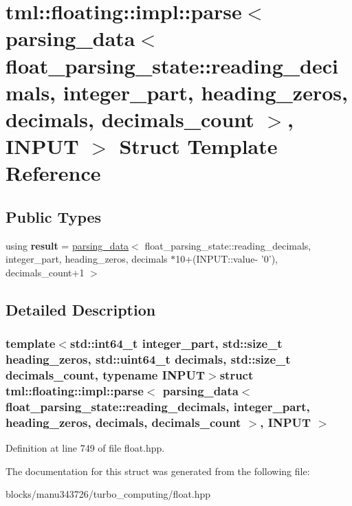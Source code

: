 \hypertarget{structtml_1_1floating_1_1impl_1_1parse_3_01parsing__data_3_01float__parsing__state_1_1reading__d695c65a45418a60bcf35e4edb1065076}{\section{tml\+:\+:floating\+:\+:impl\+:\+:parse$<$ parsing\+\_\+data$<$ float\+\_\+parsing\+\_\+state\+:\+:reading\+\_\+decimals, integer\+\_\+part, heading\+\_\+zeros, decimals, decimals\+\_\+count $>$, I\+N\+P\+U\+T $>$ Struct Template Reference}
\label{structtml_1_1floating_1_1impl_1_1parse_3_01parsing__data_3_01float__parsing__state_1_1reading__d695c65a45418a60bcf35e4edb1065076}
}
\subsection*{Public Types}
\begin{DoxyCompactItemize}
\item 
\hypertarget{structtml_1_1floating_1_1impl_1_1parse_3_01parsing__data_3_01float__parsing__state_1_1reading__d695c65a45418a60bcf35e4edb1065076_a08da2c93292b3203f21d24f44037803c}{using {\bfseries result} = \hyperlink{structtml_1_1floating_1_1impl_1_1parsing__data}{parsing\+\_\+data}$<$ float\+\_\+parsing\+\_\+state\+::reading\+\_\+decimals, integer\+\_\+part, heading\+\_\+zeros, decimals $\ast$10+(I\+N\+P\+U\+T\+::value-\/ '0'), decimals\+\_\+count+1 $>$}\label{structtml_1_1floating_1_1impl_1_1parse_3_01parsing__data_3_01float__parsing__state_1_1reading__d695c65a45418a60bcf35e4edb1065076_a08da2c93292b3203f21d24f44037803c}

\end{DoxyCompactItemize}


\subsection{Detailed Description}
\subsubsection*{template$<$std\+::int64\+\_\+t integer\+\_\+part, std\+::size\+\_\+t heading\+\_\+zeros, std\+::uint64\+\_\+t decimals, std\+::size\+\_\+t decimals\+\_\+count, typename I\+N\+P\+U\+T$>$struct tml\+::floating\+::impl\+::parse$<$ parsing\+\_\+data$<$ float\+\_\+parsing\+\_\+state\+::reading\+\_\+decimals, integer\+\_\+part, heading\+\_\+zeros, decimals, decimals\+\_\+count $>$, I\+N\+P\+U\+T $>$}



Definition at line 749 of file float.\+hpp.



The documentation for this struct was generated from the following file\+:\begin{DoxyCompactItemize}
\item 
blocks/manu343726/turbo\+\_\+computing/float.\+hpp\end{DoxyCompactItemize}
